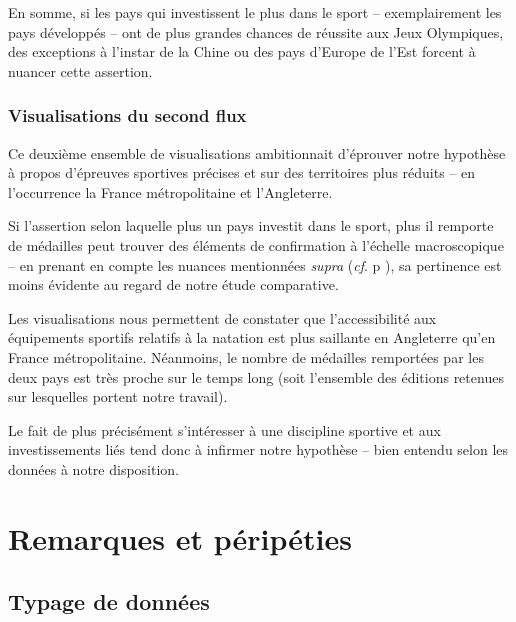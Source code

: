 \documentclass[hidelinks, 12pt]{report}
\begin{document}
En somme, si les pays qui investissent le plus dans le sport -- exemplairement les pays développés -- ont de plus grandes chances de réussite aux Jeux Olympiques, des exceptions à l'instar de la Chine ou des pays d'Europe de l'Est forcent à nuancer cette assertion.





%





\subsection{Visualisations du second flux}

Ce deuxième ensemble de visualisations ambitionnait d'éprouver notre hypothèse à propos d'épreuves sportives précises et sur des territoires plus réduits -- en l'occurrence la France métropolitaine et l'Angleterre.

Si l'assertion selon laquelle plus un pays investit dans le sport, plus il remporte de médailles peut trouver des éléments de confirmation à l'échelle macroscopique -- en prenant en compte les nuances mentionnées \textit{supra} (\textit{cf}. p \pageref{nuance}), sa pertinence est moins évidente au regard de notre étude comparative.

Les visualisations nous permettent de constater que l'accessibilité aux équipements sportifs relatifs à la natation est plus saillante en Angleterre qu'en France métropolitaine. Néanmoins, le nombre de médailles remportées par les deux pays est très proche sur le temps long (soit l'ensemble des éditions retenues sur lesquelles portent notre travail).

Le fait de plus précisément s'intéresser à une discipline sportive et aux investissements liés tend donc à infirmer notre hypothèse -- bien entendu selon les données à notre disposition.





%





\chapter{Remarques et péripéties}

\section{Typage de données}
\end{document}
